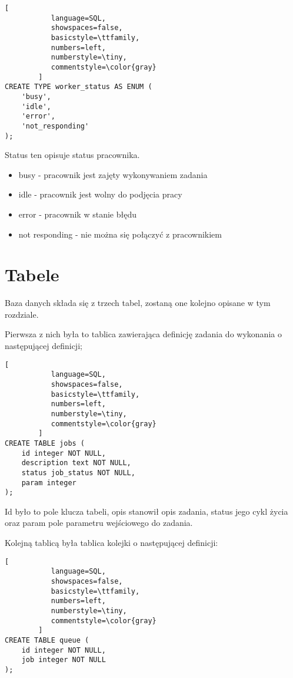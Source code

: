 \documentclass[paper=a4, fontsize=11pt]{scrartcl} %
\numberwithin{equation}{section} %
\numberwithin{figure}{section} %
\numberwithin{table}{section} %
\begin{document}
\begin{lstlisting}[
           language=SQL,
           showspaces=false,
           basicstyle=\ttfamily,
           numbers=left,
           numberstyle=\tiny,
           commentstyle=\color{gray}
        ]
CREATE TYPE worker_status AS ENUM (
    'busy',
    'idle',
    'error',
    'not_responding'
);
\end{lstlisting}

Status ten opisuje status pracownika.

\begin{itemize}
  \item busy - pracownik jest zajęty wykonywaniem zadania
  \item idle - pracownik jest wolny do podjęcia pracy
  \item error - pracownik w stanie błędu
  \item not responding - nie można się połączyć z pracownikiem
\end{itemize}



\newpage
\section {Tabele}

Baza danych składa się z trzech tabel, zostaną one kolejno opisane w tym rozdziale.

Pierwsza z nich była to tablica zawierająca definicję zadania do wykonania o następującej definicji;

\begin{lstlisting}[
           language=SQL,
           showspaces=false,
           basicstyle=\ttfamily,
           numbers=left,
           numberstyle=\tiny,
           commentstyle=\color{gray}
        ]
CREATE TABLE jobs (
    id integer NOT NULL,
    description text NOT NULL,
    status job_status NOT NULL,
    param integer
);
\end{lstlisting}

Id było to pole klucza tabeli, opis stanowił opis zadania, status jego cykl życia oraz param pole
parametru wejściowego do zadania.


Kolejną tablicą była tablica kolejki o następującej definicji:

\begin{lstlisting}[
           language=SQL,
           showspaces=false,
           basicstyle=\ttfamily,
           numbers=left,
           numberstyle=\tiny,
           commentstyle=\color{gray}
        ]
CREATE TABLE queue (
    id integer NOT NULL,
    job integer NOT NULL
);
\end{lstlisting}
\end{document}
